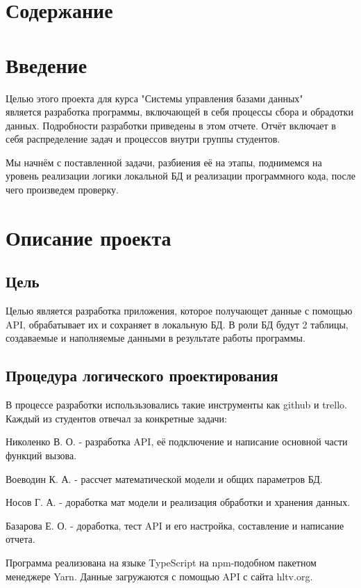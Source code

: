 \documentclass[utf8,14pt,a4paper,oneside,russian]{book}
\makeatletter
\renewcommand{\tableofcontents}{\section*{Содержание}\markboth{Содержание}{}\@starttoc{toc}\newpage}
\makeatother
\begin{document}
\tableofcontents

\newpage
\section{Введение}
Целью этого проекта для курса "Системы управления базами данных" \\
является разработка программы, включающей в себя процессы сбора и обрадотки данных. 
Подробности разработки приведены в этом отчете. Отчёт
включает в себя распределение задач и процессов внутри группы студентов.

Мы начнём с поставленной задачи, разбиения её на этапы, поднимемся на уровень 
реализации логики локальной БД и реализации программного кода, после чего
произведем проверку. 

\newpage
\section{Описание проекта}

\subsection{Цель}

Целью является разработка приложения, которое получающет данные с помощью API,
обрабатывает их и сохраняет в локальную БД. В роли БД будут 2 таблицы, создаваемые
и наполняемые данными в результате работы программы. 

\subsection{Процедура логического проектирования}

В процессе разработки использьзовались такие инструменты как github
 и trello. Каждый из студентов отвечал за конкретные задачи:

 Николенко В. О. - разработка API, её подключение и написание основной части функций вызова.

 Воеводин К. А. - рассчет математической модели и общих параметров БД.

 Носов Г. А. - доработка мат модели и реализация обработки и хранения данных.

 Базарова Е. О. - доработка, тест API и его настройка, составление и написание отчета.

Программа реализована на языке TypeScript на npm-подобном  
пакетном менеджере Yarn. Данные загружаются с помощью API с сайта hltv.org.
\end{document}
